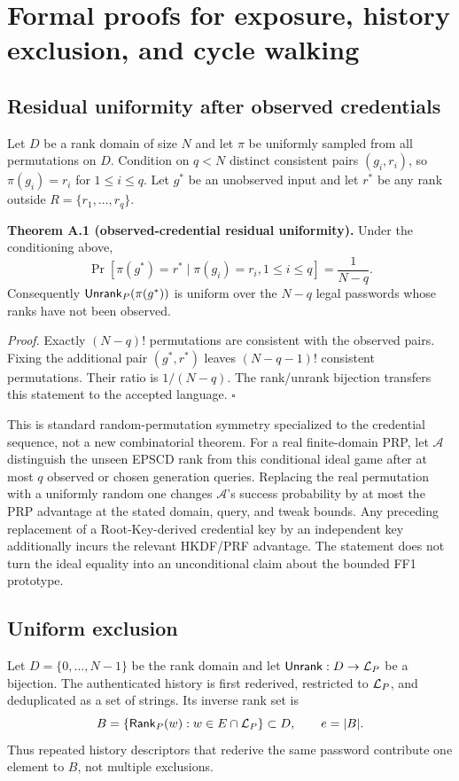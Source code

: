 \section{Formal proofs for exposure, history exclusion, and cycle walking}
\label{app:formal-proofs}

\subsection{Residual uniformity after observed credentials}

Let $D$ be a rank domain of size $N$ and let $\pi$ be uniformly sampled from
all permutations on $D$.  Condition on $q<N$ distinct consistent pairs
$(g_i,r_i)$, so $\pi(g_i)=r_i$ for $1\leq i\leq q$.  Let $g^*$ be an
unobserved input and let $r^*$ be any rank outside
$R=\{r_1,\ldots,r_q\}$.

\textbf{Theorem A.1 (observed-credential residual uniformity).}
Under the conditioning above,
\[
\Pr[\pi(g^*)=r^*\mid \pi(g_i)=r_i,1\leq i\leq q]
=\frac{1}{N-q}.
\]
Consequently $\mathsf{Unrank}_P(\pi(g^*))$ is uniform over the $N-q$ legal passwords
whose ranks have not been observed.

\textit{Proof.}
Exactly $(N-q)!$ permutations are consistent with the observed pairs.  Fixing
the additional pair $(g^*,r^*)$ leaves $(N-q-1)!$ consistent permutations.
Their ratio is $1/(N-q)$.  The rank/unrank bijection transfers this statement
to the accepted language. \hfill$\square$

This is standard random-permutation symmetry specialized to the credential
sequence, not a new combinatorial theorem.  For a real finite-domain PRP, let
$\mathcal A$ distinguish the unseen EPSCD rank from this conditional ideal
game after at most $q$ observed or chosen generation queries.  Replacing the
real permutation with a uniformly random one changes $\mathcal A$'s success
probability by at most the PRP advantage at the stated domain, query, and tweak
bounds.  Any preceding replacement of a Root-Key-derived credential key by an
independent key additionally incurs the relevant HKDF/PRF advantage.  The
statement does not turn the ideal equality into an unconditional claim about
the bounded FF1 prototype.

\subsection{Uniform exclusion}

Let $D=\{0,\ldots,N-1\}$ be the rank domain and let
$\mathsf{Unrank}:D\rightarrow\mathcal{L}_P$ be a bijection.  The authenticated history is
first rederived, restricted to $\mathcal{L}_P$, and deduplicated as a set of strings.
Its inverse rank set is
\[
B=\{\mathsf{Rank}_P(w):w\in E\cap\mathcal{L}_P\}\subset D,
\qquad e=|B|.
\]
Thus repeated history descriptors that rederive the same password contribute
one element to $B$, not multiple exclusions.


